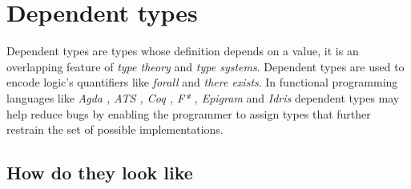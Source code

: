 \chapter{Dependent types}

    Dependent types are types whose definition depends on a value, it is an overlapping feature of \textit{type
theory} and \textit{type systems}. Dependent types are used to encode logic's quantifiers like \textit{forall}
 and \textit{there exists}. In functional programming languages like \textit{Agda , ATS , Coq , F* , Epigram}
and \textit{Idris} dependent types may help reduce bugs by enabling the programmer to assign types that 
further restrain the set of possible implementations. 

\section{How do they look like}
